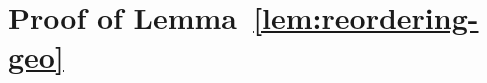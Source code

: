 \documentclass[12pt]{article}
\newcommand{\df}{\mathrm{d}}
\newcommand{\ind}{\mathbf{1}}
\begin{document}

{
	\section{Proof of Lemma~\ref{lem:reordering-geo}} \label{app:reordering-geo}
}
\end{document}
